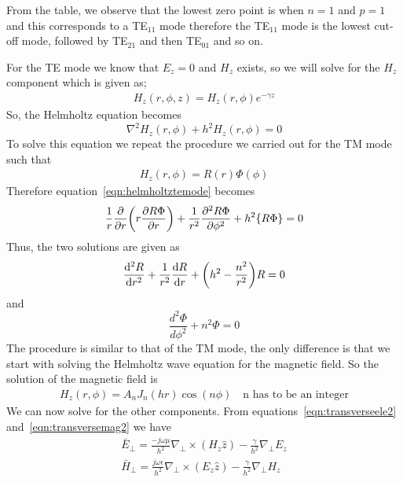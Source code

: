From the table, we observe that the lowest zero point is when $n = 1$ and $p = 1$ and this corresponds to a TE$_{11}$ mode therefore the TE$_{11}$ mode is the lowest cut-off mode, followed by TE$_{21}$ and then TE$_{01}$ and so on.

For the TE mode we know that $E_z = 0$ and $H_z$ exists, so we will solve for the $H_z$  component which is given as;
\begin{align*}
H_z(r,\phi,z) = H_z(r,\phi)e^{-\gamma z}
\end{align*}
So, the Helmholtz equation becomes
\begin{equation}
\nabla^2 H_z(r,\phi) + h^2 H_z(r,\phi) = 0
\label{eqn:helmholtztemode}
\end{equation}
To solve this equation we repeat the procedure we carried out for the TM mode such that 
\begin{align*}
H_z(r,\phi)= R(r)\Phi(\phi)
\end{align*}
Therefore equation~\eqref{eqn:helmholtztemode} becomes
\begin{align*}
\frac{1}{r}\partialderivative{}{r}\bigg(r\partialderivative{R\Phi}{r}\bigg) + \frac{1}{r^2}\partialderivative[2]{R\Phi}{\phi} + h^2\{R\Phi\} = 0
\end{align*}
Thus, the two solutions are given as
\begin{equation}
\derivative[2]{R}{r} + \frac{1}{r^2}\derivative{R}{r} + \bigg(h^2 - \frac{n^2}{r^2}\bigg)R = 0
\label{eqn:radialtemode}
\end{equation}
and 
\begin{equation}
\dfrac{d^2\Phi}{d\phi^2} + n^2\Phi = 0
\label{eqn:angulartemode}
\end{equation}
The procedure is similar to that of the TM mode, the only difference is that we start with solving the Helmholtz wave equation for the magnetic field. So the solution of the magnetic field is 
\begin{align*}
H_z(r,\phi) = A_nJ_n(hr)\cos(n\phi)\quad\text{n has to be an integer}
\end{align*}
We can now solve for the other components. From equations~\eqref{eqn:transverseele2} and~\eqref{eqn:transversemag2} we have
\begin{align*}
\bar{E}_\perp = \frac{-j\omega\mu}{h^2}\nabla_\perp\times(H_z\hat{z}) - \frac{\gamma}{h^2}\nabla_\perp E_z\\
\bar{H}_\perp = \frac{j\omega\epsilon}{h^2}\nabla_\perp\times(E_z\hat{z}) - \frac{\gamma}{h^2}\nabla_\perp H_z
\end{align*}

